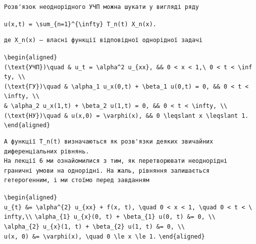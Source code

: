 \documentclass[
  ukrainian,
]{article}
\begin{document}
\begin{verbatim}
Розв'язок неоднорідного УЧП можна шукати у вигляді ряду
\end{verbatim}

\texttt{u(x,t)\ =\ \textbackslash{}sum\_\{n=1\}\^{}\{\textbackslash{}infty\}\ T\_n(t)\ X\_n(x).}

\begin{verbatim}
де X_n(x) — власні функції відповідної однорідної задачі
\end{verbatim}

\texttt{\textbackslash{}begin\{aligned\}}
\texttt{(\textbackslash{}text\{УЧП\})\textbackslash{}quad\ \&\ u\_t\ =\ \textbackslash{}alpha\^{}2\ u\_\{xx\},\ \&\&\ 0\ \textless{}\ x\ \textless{}\ 1,\textbackslash{}\ 0\ \textless{}\ t\ \textless{}\ \textbackslash{}infty,\ \textbackslash{}\textbackslash{}}
\texttt{(\textbackslash{}text\{ГУ\})\textbackslash{}quad\ \&\ \textbackslash{}alpha\_1\ u\_x(0,t)\ +\ \textbackslash{}beta\_1\ u(0,t)\ =\ 0,\ \&\&\ 0\ \textless{}\ t\ \textless{}\ \textbackslash{}infty,\ \textbackslash{}\textbackslash{}}
\texttt{\&\ \textbackslash{}alpha\_2\ u\_x(1,t)\ +\ \textbackslash{}beta\_2\ u(1,t)\ =\ 0,\ \&\&\ 0\ \textless{}\ t\ \textless{}\ \textbackslash{}infty,\ \textbackslash{}\textbackslash{}}
\texttt{(\textbackslash{}text\{НУ\})\textbackslash{}quad\ \&\ u(x,0)\ =\ \textbackslash{}varphi(x),\ \&\&\ 0\ \textbackslash{}leqslant\ x\ \textbackslash{}leqslant\ 1.}
\texttt{\textbackslash{}end\{aligned\}}

\begin{verbatim}
А функції T_n(t) визначаються як розв'язки деяких звичайних диференціальних рівнянь.
На лекції 6 ми ознайомилися з тим, як перетворювати неоднорідні граничні умови на однорідні. На жаль, рівняння залишається гетерогенним, і ми стоїмо перед завданням
\end{verbatim}

\texttt{\textbackslash{}begin\{aligned\}}
\texttt{u\_\{t\}\ \&=\ \textbackslash{}alpha\^{}\{2\}\ u\_\{xx\}\ +\ f(x,\ t),\ \textbackslash{}quad\ 0\ \textless{}\ x\ \textless{}\ 1,\ \textbackslash{}quad\ 0\ \textless{}\ t\ \textless{}\ \textbackslash{}infty,\textbackslash{}\textbackslash{}}
\texttt{\textbackslash{}alpha\_\{1\}\ u\_\{x\}(0,\ t)\ +\ \textbackslash{}beta\_\{1\}\ u(0,\ t)\ \&=\ 0,\ \textbackslash{}\textbackslash{}}
\texttt{\textbackslash{}alpha\_\{2\}\ u\_\{x\}(1,\ t)\ +\ \textbackslash{}beta\_\{2\}\ u(1,\ t)\ \&=\ 0,\ \textbackslash{}\textbackslash{}}
\texttt{u(x,\ 0)\ \&=\ \textbackslash{}varphi(x),\ \textbackslash{}quad\ 0\ \textbackslash{}le\ x\ \textbackslash{}le\ 1.}
\texttt{\textbackslash{}end\{aligned\}}
\end{document}
